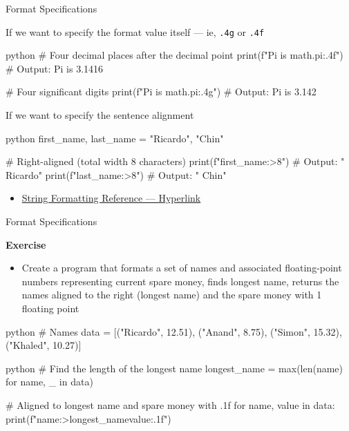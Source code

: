 \documentclass[
	11pt, 
]{beamer}
\begin{document}

\begin{frame}[fragile]{Format Specifications}

If we want to specify the format value itself --- ie, \texttt{.4g} or \texttt{.4f}

\begin{mintedbox}{python}
# Four decimal places after the decimal point
print(f"Pi is {math.pi:.4f}") # Output: Pi is 3.1416

# Four significant digits
print(f"Pi is {math.pi:.4g}") # Output: Pi is 3.142
\end{mintedbox}

If we want to specify the sentence alignment

\begin{mintedbox}{python}
first_name, last_name = "Ricardo", "Chin"

# Right-aligned (total width 8 characters)
print(f"{first_name:>8}")  # Output: " Ricardo"
print(f"{last_name:>8}")   # Output: "    Chin"
\end{mintedbox}

\begin{itemize}
    \item \href{https://mkaz.blog/working-with-python/string-formatting/}{String Formatting Reference --- Hyperlink}
\end{itemize}

\end{frame}


\begin{frame}[fragile]{Format Specifications}

\begin{alertblock}{\textbf{Exercise}}
\begin{itemize}
    \item Create a program that formats a set of names and associated floating-point numbers representing current spare money, finds longest name, returns the names aligned to the right (longest name) and the spare money with 1 floating point
\end{itemize}
\begin{mintedbox}{python}
# Names
data = [("Ricardo",  12.51), ("Anand",     8.75),
        ("Simon",    15.32), ("Khaled",   10.27)]
\end{mintedbox} 
\end{alertblock}
\pause
\begin{mintedbox}{python}
# Find the length of the longest name
longest_name = max(len(name) for name, _ in data)

# Aligned to longest name and spare money with .1f
for name, value in data:
    print(f"{name:>{longest_name}}{value:.1f}")
\end{mintedbox} 
\end{frame}
\end{document}
